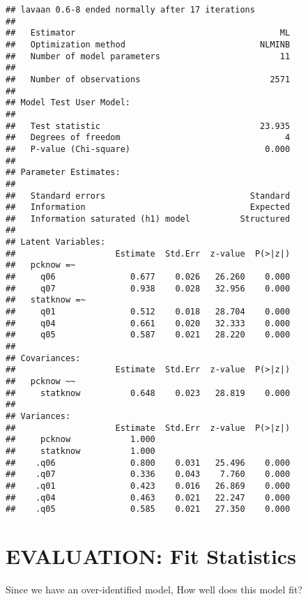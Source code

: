 \documentclass[
]{article}
\begin{document}
\begin{verbatim}
## lavaan 0.6-8 ended normally after 17 iterations
## 
##   Estimator                                         ML
##   Optimization method                           NLMINB
##   Number of model parameters                        11
##                                                       
##   Number of observations                          2571
##                                                       
## Model Test User Model:
##                                                       
##   Test statistic                                23.935
##   Degrees of freedom                                 4
##   P-value (Chi-square)                           0.000
## 
## Parameter Estimates:
## 
##   Standard errors                             Standard
##   Information                                 Expected
##   Information saturated (h1) model          Structured
## 
## Latent Variables:
##                    Estimate  Std.Err  z-value  P(>|z|)
##   pcknow =~                                           
##     q06               0.677    0.026   26.260    0.000
##     q07               0.938    0.028   32.956    0.000
##   statknow =~                                         
##     q01               0.512    0.018   28.704    0.000
##     q04               0.661    0.020   32.333    0.000
##     q05               0.587    0.021   28.220    0.000
## 
## Covariances:
##                    Estimate  Std.Err  z-value  P(>|z|)
##   pcknow ~~                                           
##     statknow          0.648    0.023   28.819    0.000
## 
## Variances:
##                    Estimate  Std.Err  z-value  P(>|z|)
##     pcknow            1.000                           
##     statknow          1.000                           
##    .q06               0.800    0.031   25.496    0.000
##    .q07               0.336    0.043    7.760    0.000
##    .q01               0.423    0.016   26.869    0.000
##    .q04               0.463    0.021   22.247    0.000
##    .q05               0.585    0.021   27.350    0.000
\end{verbatim}

\hypertarget{evaluation-fit-statistics}{%
\section{EVALUATION: Fit Statistics}\label{evaluation-fit-statistics}}

Since we have an over-identified model, How well does this model fit?
\end{document}
